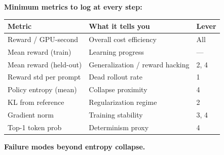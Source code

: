 \textbf{Minimum metrics to log at every step:}

\begin{table}[h]
\centering
\small
\begin{tabular}{@{}lll@{}}
\toprule
\textbf{Metric} & \textbf{What it tells you} & \textbf{Lever} \\
\midrule
Reward / GPU-second    & Overall cost efficiency        & All \\
Mean reward (train)    & Learning progress              & --- \\
Mean reward (held-out) & Generalization / reward hacking & 2, 4 \\
Reward std per prompt  & Dead rollout rate              & 1 \\
Policy entropy (mean)  & Collapse proximity             & 4 \\
KL from reference      & Regularization regime          & 2 \\
Gradient norm          & Training stability             & 3, 4 \\
Top-1 token prob       & Determinism proxy              & 4 \\
\bottomrule
\end{tabular}
\end{table}

\textbf{Failure modes beyond entropy collapse.}

